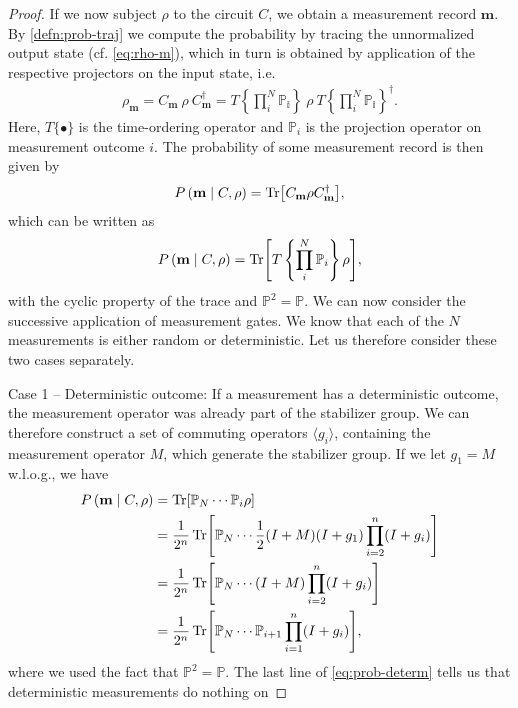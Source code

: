 \begin{proof}
If we now subject $\rho$ to the circuit $C$, we obtain a measurement record
$\mathbf{m}$. By \cref{defn:prob-traj} we compute the probability by tracing the
unnormalized output state (cf. \cref{eq:rho-m}), which in turn is obtained by application
of the respective projectors on the input state, i.e.
\begin{align}
  \rho_\mathbf{m} = C_\mathbf{m}\ \rho \ C_\mathbf{m}^\dagger 
  = T\left\{\prod_i^N\mathbb{P_i}\right\}\ \rho \ T\left\{\prod_i^N\mathbb{P_i}\right\}^\dagger 
.\end{align}
Here, $T\{\bullet\}$ is the time-ordering operator and $\mathbb{P}_i$ is the
projection operator on measurement outcome $i$. The probability of some
measurement record is then given by
\begin{align}
  P\left(\mathbf{m} \mid C, \rho\right) = \Tr[C_\mathbf{m} \rho
  C_\mathbf{m}^\dagger]
,\end{align}
which can be written as
\begin{align}
  P\left(\mathbf{m} \mid C, \rho\right) = \Tr[T\left\{\prod_i^N
  \mathbb{P}_i\right\}\rho]
,\end{align}
with the cyclic property of the trace and $\mathbb{P}^2 = \mathbb{P}$.
We can now consider the successive application of measurement gates.
We know that each of the $N$ measurements is either random or deterministic.
Let us therefore consider these two cases separately.
\par{Case 1 -- Deterministic outcome:}
If a measurement has a deterministic outcome, the measurement operator was
already part of the stabilizer group. We can therefore construct a set of
commuting operators $\langle g_i\rangle$, containing the measurement operator
$M$, which generate the
stabilizer group. If we let $g_1=M$ w.l.o.g., we have
\begin{align}
  P\left(\mathbf{m} \mid C, \rho\right) 
  &= \Tr[ \mathbb{P}_N \cdots \mathbb{P}_i \rho ] \nonumber\\
  &= \frac{1}{2^n}\Tr[\mathbb{P}_N \cdots \frac{1}{2} (I + M) (I + g_1)
  \prod_{i=2}^n (I + g_i)] \nonumber\\
  &= \frac{1}{2^n}\Tr[\mathbb{P}_N\cdots (I+M) \prod_{i=2}^n (I+g_i)] \nonumber\\
  &= \frac{1}{2^n}\Tr[\mathbb{P}_N\cdots \mathbb{P}_{i+1} \prod_{i=1}^n
  (I+g_i)] \label{eq:prob-determ}
,\end{align}
where we used the fact that $\mathbb{P}^2 =\mathbb{P}$. The last line of
\cref{eq:prob-determ} tells us that deterministic measurements do nothing on

\end{proof}
